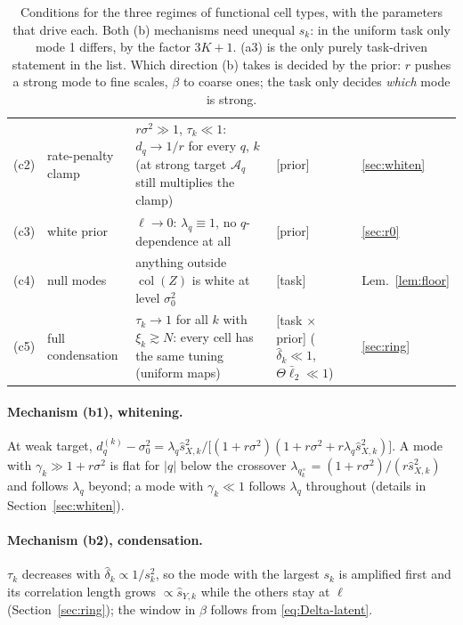 \documentclass[11pt,a4paper]{article}
\newcommand{\col}{\operatorname{col}}
\newcommand{\amp}{\mathcal A}
\newcommand{\task}{\textsf{[task]}}
\newcommand{\prior}{\textsf{[prior]}}
\newcommand{\mixed}{\textsf{[task $\times$ prior]}}
\theoremstyle{remark}
\begin{document}
\begin{table}[t]
\begin{tabular}{@{}>{\raggedright\arraybackslash}p{1.0cm}>{\raggedright\arraybackslash}p{2.0cm}>{\raggedright\arraybackslash}p{6.6cm}>{\raggedright\arraybackslash}p{3.4cm}>{\raggedright\arraybackslash}p{1.3cm}@{}}
    (c2) & rate-penalty clamp & $r\sigma^2\gg1$, $\tau_k\ll1$: $d_q\to1/r$ for every $q$, $k$ (at strong target $\amp_q$ still multiplies the clamp) & \prior{} & \ref{sec:whiten} \\
    (c3) & white prior & $\ell\to0$: $\lambda_q\equiv1$, no $q$-dependence at all & \prior{} & \ref{sec:r0} \\
    (c4) & null modes & anything outside $\col(Z)$ is white at level $\sigma_0^2$ & \task{} & Lem.~\ref{lem:floor} \\
    (c5) & full condensation & $\tau_k\to1$ for all $k$ with $\xi_k\gtrsim N$: every cell has the same tuning (uniform maps) & \mixed{} ($\hat\delta_k\ll1$, $\Theta\bar\ell_2\ll1$) & \ref{sec:ring} \\
    \bottomrule
  \end{tabular}
  \caption{Conditions for the three regimes of functional cell types, with the parameters that drive each. Both (b) mechanisms need unequal $s_k$: in the uniform task only mode 1 differs, by the factor $3K+1$. (a3) is the only purely task-driven statement in the list. Which direction (b) takes is decided by the prior: $r$ pushes a strong mode to fine scales, $\beta$ to coarse ones; the task only decides \emph{which} mode is strong.}
  \label{tab:regimes}
\end{table}

\paragraph{Mechanism (b1), whitening.} At weak target, $d_q^{(k)} - \sigma_0^2 = \lambda_q\hat s_{X,k}^2/\big[(1+r\sigma^2)(1+r\sigma^2 + r\lambda_q\hat s_{X,k}^2)\big]$. A mode with $\gamma_k\gg1+r\sigma^2$ is flat for $|q|$ below the crossover $\lambda_{q_k^\times} = (1+r\sigma^2)/(r\hat s_{X,k}^2)$ and follows $\lambda_q$ beyond; a mode with $\gamma_k\ll1$ follows $\lambda_q$ throughout (details in Section~\ref{sec:whiten}).

\paragraph{Mechanism (b2), condensation.} $\tau_k$ decreases with $\hat\delta_k\propto1/s_k^2$, so the mode with the largest $s_k$ is amplified first and its correlation length grows $\propto\hat s_{Y,k}$ while the others stay at $\ell$ (Section~\ref{sec:ring}); the window in $\beta$ follows from \eqref{eq:Delta-latent}.
\end{document}
